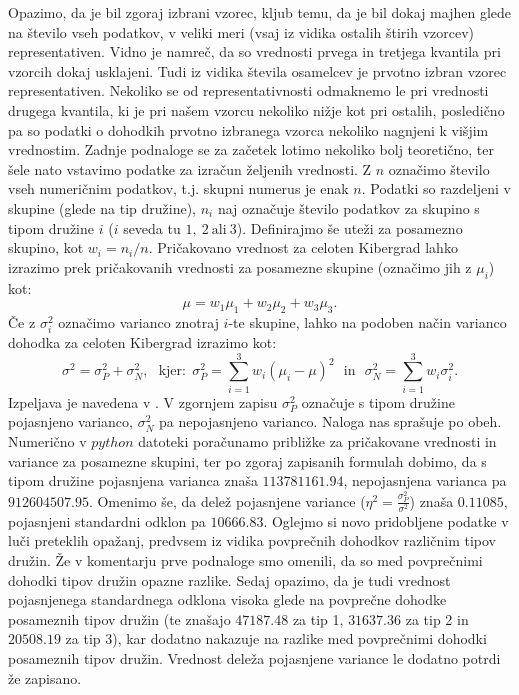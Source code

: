 \documentclass{article}
\begin{document}
Opazimo, da je bil zgoraj izbrani vzorec, kljub temu, da je bil dokaj majhen glede na število vseh podatkov, v veliki meri (vsaj iz vidika ostalih štirih vzorcev) representativen.
Vidno je namreč, da so vrednosti prvega in tretjega kvantila pri vzorcih dokaj usklajeni. 
Tudi iz vidika števila osamelcev je prvotno izbran vzorec representativen. 
Nekoliko se od representativnosti odmaknemo le pri vrednosti drugega kvantila, ki je pri našem vzorcu nekoliko nižje kot pri ostalih, posledično pa so podatki o dohodkih prvotno izbranega vzorca nekoliko nagnjeni k višjim vrednostim.
\newline
\newline
Zadnje podnaloge se za začetek lotimo nekoliko bolj teoretično, ter šele nato vstavimo podatke za izračun željenih vrednosti. 
Z $n$ označimo število vseh numeričnim podatkov, t.j. skupni numerus je enak $n$. Podatki so razdeljeni v skupine (glede na tip družine), $n_i$ naj označuje število podatkov za skupino s tipom družine $i$ ($i$ seveda tu $1,~2~\text{ali}~3$).
Definirajmo še uteži za posamezno skupino, kot $w_i = n_i/n$.
\newline
Pričakovano vrednost za celoten Kibergrad lahko izrazimo prek pričakovanih vrednosti za posamezne skupine (označimo jih z $\mu_i$) kot:
$$
    \mu = w_1 \mu_1 + w_2 \mu_2 + w_3 \mu_3.
$$
Če z $\sigma_{i}^2$ označimo varianco znotraj $i$-te skupine, lahko na podoben način varianco dohodka za celoten Kibergrad izrazimo kot:
$$
\sigma^2 = \sigma_{P}^2 + \sigma_{N}^2,~~~\text{kjer:}~~\sigma_{P}^2 = \sum_{i=1}^{3}{w_i(\mu_i - \mu)^2}~~~\text{in}~~~\sigma_{N}^2 = \sum_{i=1}^{3}{w_i \sigma_{i}^2}.
$$
Izpeljava je navedena v \cite{poj_nepo_var}. V zgornjem zapisu $\sigma_P^2$ označuje s tipom družine pojasnjeno varianco, $\sigma_N^2$ pa nepojasnjeno varianco. Naloga nas sprašuje po obeh. 
\newline
Numerično v $python$ datoteki poračunamo približke za pričakovane vrednosti in variance za posamezne skupini, ter po zgoraj zapisanih formulah dobimo, 
da s tipom družine pojasnjena varianca znaša $113781161.94$, nepojasnjena varianca pa $912604507.95$. Omenimo še, da delež pojasnjene variance ($\eta^2 = \frac{\sigma_{P}^2}{\sigma^2}$) znaša $0.11085$, pojasnjeni standardni odklon pa $10666.83$.
\newline
\newline
Oglejmo si novo pridobljene podatke v luči preteklih opažanj, predvsem iz vidika povprečnih dohodkov različnim tipov družin. Že v komentarju prve podnaloge smo omenili, da so med povprečnimi dohodki tipov družin opazne razlike.  
Sedaj opazimo, da je tudi vrednost pojasnjenega standardnega odklona visoka glede na povprečne dohodke posameznih tipov družin (te znašajo $47187.48$ za tip 1, $31637.36$ za tip 2 in $20508.19$ za tip 3), kar dodatno nakazuje na razlike med povprečnimi dohodki posameznih tipov družin.
Vrednost deleža pojasnjene variance le dodatno potrdi že zapisano.
\end{document}
